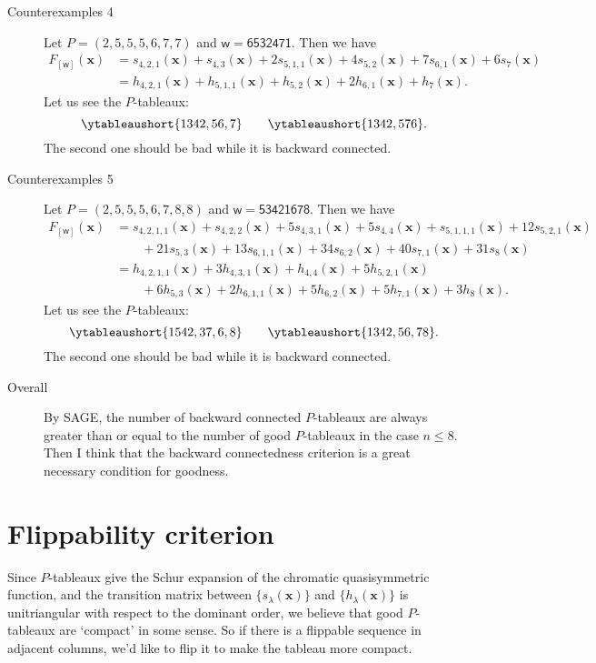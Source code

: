 \documentclass[11pt,reqno]{amsart}
\theoremstyle{definition}
\theoremstyle{remark}
\numberwithin{equation}{section}
\newcommand\xx{\mathbf{x}}
\newcommand\ww{\mathsf{w}}
\begin{document}
\begin{description}
  \item[Counterexamples 4] Let \( P=(2, 5, 5, 5, 6, 7, 7) \) and \( \ww=\mathsf{6532471} \).
  Then we have
  \begin{align*}
    F_{[\ww]}(\xx)
      &= s_{4,2,1}(\xx) + s_{4,3}(\xx) + 2 s_{5,1,1}(\xx) + 4 s_{5,2}(\xx) + 7 s_{6,1}(\xx) + 6 s_{7}(\xx) \\
      &= h_{4,2,1}(\xx) + h_{5,1,1}(\xx) + h_{5,2}(\xx) + 2 h_{6,1}(\xx) + h_{7}(\xx).
  \end{align*}
  Let us see the \( P \)-tableaux:
  \[
    \ytableaushort{1342,56,7} \qquad \ytableaushort{1342,576}.
  \]
  The second one should be bad while it is backward connected.
  \item[Counterexamples 5] Let \( P=(2, 5, 5, 5, 6, 7, 8, 8) \) and \( \ww=\mathsf{53421678} \).
  Then we have
  \begin{align*}
    F_{[\ww]}(\xx)
      &= s_{4,2,1,1}(\xx) + s_{4,2,2}(\xx) + 5 s_{4,3,1}(\xx) + 5 s_{4,4}(\xx) + s_{5,1,1,1}(\xx) + 12 s_{5,2,1}(\xx)\\
        &\qquad + 21 s_{5,3}(\xx) + 13 s_{6,1,1}(\xx) + 34 s_{6,2}(\xx) + 40 s_{7,1}(\xx) + 31 s_{8}(\xx) \\
      &= h_{4,2,1,1}(\xx) + 3 h_{4,3,1}(\xx) + h_{4,4}(\xx) + 5 h_{5,2,1}(\xx) \\
        &\qquad + 6 h_{5,3}(\xx) + 2 h_{6,1,1}(\xx) + 5 h_{6,2}(\xx) + 5 h_{7,1}(\xx) + 3 h_{8}(\xx).
  \end{align*}
  Let us see the \( P \)-tableaux:
  \[
    \ytableaushort{1542,37,6,8} \qquad \ytableaushort{1342,56,78}.
  \]
  The second one should be bad while it is backward connected.
  \item[Overall] By SAGE, the number of backward connected \( P \)-tableaux are always greater than
  or equal to the number of good \( P \)-tableaux in the case \( n\le 8 \). Then I think that
  the backward connectedness criterion is a great necessary condition for goodness.
\end{description}

\section{Flippability criterion}
Since \( P \)-tableaux give the Schur expansion of the chromatic quasisymmetric function, and 
the transition matrix between \( \{s_\lambda(\xx)\} \) and \( \{h_\lambda(\xx)\} \) is
unitriangular with respect to the dominant order, we believe that good \( P \)-tableaux are
`compact' in some sense. So if there is a flippable sequence in adjacent columns,
we'd like to flip it to make the tableau more compact.
\end{document}
